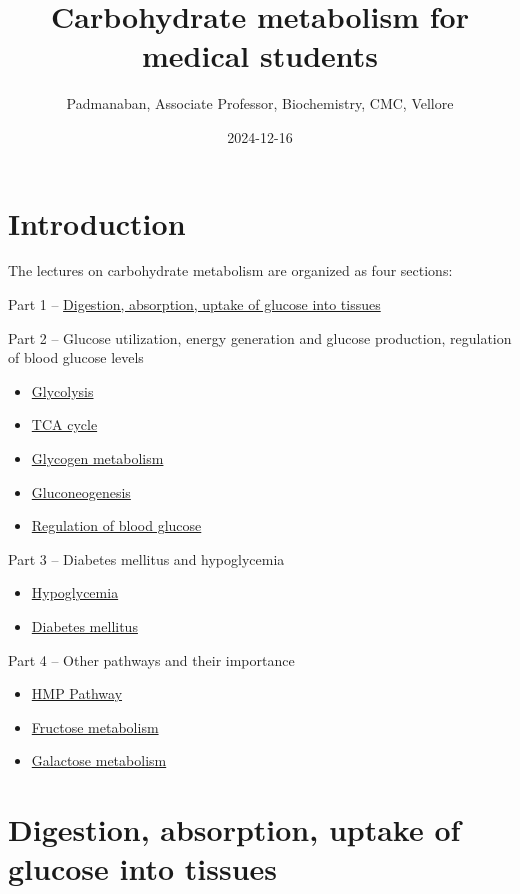 \documentclass[
]{book}
\title{Carbohydrate metabolism for medical students}
\author{Padmanaban, Associate Professor, Biochemistry, CMC, Vellore}
\date{2024-12-16}
\providecommand{\tightlist}{%
  \setlength{\itemsep}{0pt}\setlength{\parskip}{0pt}}
\begin{document}
\maketitle

{
\setcounter{tocdepth}{1}
\tableofcontents
}
\chapter{Introduction}\label{introduction}

The lectures on carbohydrate metabolism are organized as four sections:

Part 1 -- \hyperref[Digestion]{Digestion, absorption, uptake of glucose into tissues}

Part 2 -- Glucose utilization, energy generation and glucose production, regulation of blood glucose levels

\begin{itemize}
\tightlist
\item
  \hyperref[glycolysis]{Glycolysis}
\item
  \hyperref[tca-cycle]{TCA cycle}
\item
  \hyperref[glycogen-metabolism]{Glycogen metabolism}
\item
  \hyperref[gluconeogenesis]{Gluconeogenesis}
\item
  \hyperref[regulation-of-blood-glucose]{Regulation of blood glucose}
\end{itemize}

Part 3 -- Diabetes mellitus and hypoglycemia

\begin{itemize}
\tightlist
\item
  \hyperref[hypoglycemia]{Hypoglycemia}
\item
  \hyperref[diabetes-mellitus]{Diabetes mellitus}
\end{itemize}

Part 4 -- Other pathways and their importance

\begin{itemize}
\tightlist
\item
  \hyperref[hmp-pathway]{HMP Pathway}
\item
  \hyperref[fructose-metabolism]{Fructose metabolism}
\item
  \hyperref[galactose-metabolism]{Galactose metabolism}
\end{itemize}

\chapter{Digestion, absorption, uptake of glucose into tissues}\label{Digestion}
\end{document}
